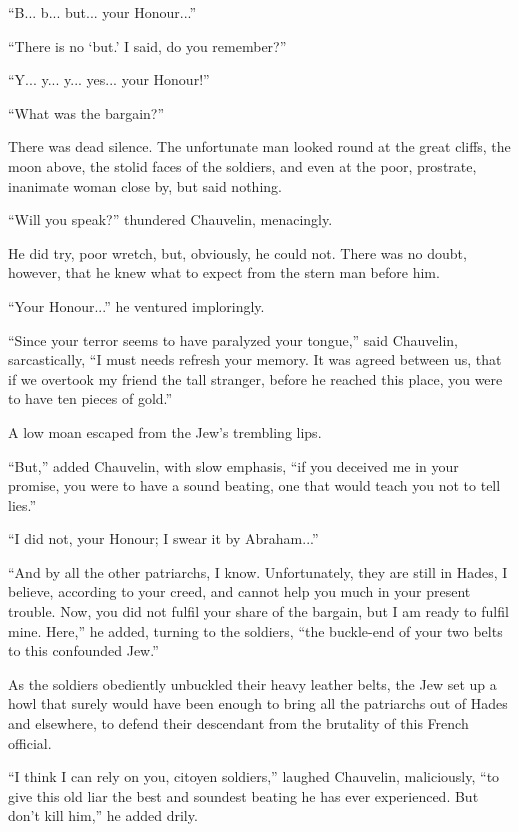 \documentclass[paper=5.5in:8.5in,BCOR=7mm,twoside,DIV=calc,12pt,usegeometry,chapterprefix,endperiod,headings=big]{scrbook}
\begin{document}
\enquote{B... b... but... your Honour...}

\enquote{There is no \enquote{but.} I said, do you remember?}

\enquote{Y... y... y... yes... your Honour!}

\enquote{What was the bargain?}

There was dead silence. The unfortunate man looked round at the great cliffs, the moon above, the stolid faces of the soldiers, and even at the poor, prostrate, inanimate woman close by, but said nothing.

\enquote{Will you speak?} thundered Chauvelin, menacingly.

He did try, poor wretch, but, obviously, he could not. There was no doubt, however, that he knew what to expect from the stern man before him.

\enquote{Your Honour...} he ventured imploringly.

\enquote{Since your terror seems to have paralyzed your tongue,} said Chauvelin, sarcastically, \enquote{I must needs refresh your memory. It was agreed between us, that if we overtook my friend the tall stranger, before he reached this place, you were to have ten pieces of gold.}

A low moan escaped from the Jew's trembling lips.

\enquote{But,} added Chauvelin, with slow emphasis, \enquote{if you deceived me in your promise, you were to have a sound beating, one that would teach you not to tell lies.}

\enquote{I did not, your Honour; I swear it by Abraham...}

\enquote{And by all the other patriarchs, I know. Unfortunately, they are still in Hades, I believe, according to your creed, and cannot help you much in your present trouble. Now, you did not fulfil your share of the bargain, but I am ready to fulfil mine. Here,} he added, turning to the soldiers, \enquote{the buckle-end of your two belts to this confounded Jew.}

As the soldiers obediently unbuckled their heavy leather belts, the Jew set up a howl that surely would have been enough to bring all the patriarchs out of Hades and elsewhere, to defend their descendant from the brutality of this French official.

\enquote{I think I can rely on you, citoyen soldiers,} laughed Chauvelin, maliciously, \enquote{to give this old liar the best and soundest beating he has ever experienced. But don't kill him,} he added drily.
\end{document}
